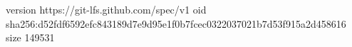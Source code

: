 version https://git-lfs.github.com/spec/v1
oid sha256:d52fdf6592efc843189d7e9d95e1f0b7fcec0322037021b7d53f915a2d458616
size 149531
